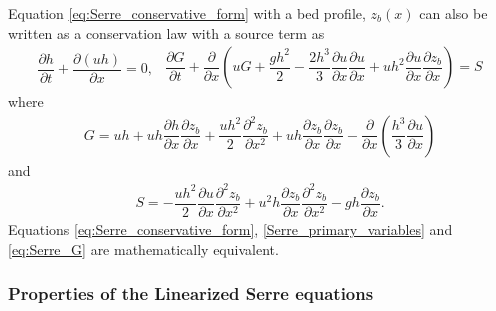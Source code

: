 \documentclass[preprint,sort&compress,1p]{article}
\begin{document}
Equation \eqref{eq:Serre_conservative_form} with a bed profile, $z_b(x)$ can also be written  as a conservation law with a source term as
\begin{subequations}
\label{eq:Serre_G}
\begin{gather}
\dfrac{\partial h}{\partial t} + \dfrac{\partial (uh)}{\partial x} = 0,
\label{eq:Serre_continuity}
\end{gather}
\label{eqnSerreG}
\begin{align}
\label{eqnSerreconsconmom}
\dfrac{\partial G}{\partial t} + \dfrac{\partial}{\partial x} \left( u G + \dfrac{gh^2}{2} - \dfrac{2h^3}{3} \dfrac{\partial u}{\partial x}\dfrac{\partial u}{\partial x} + u h^2\dfrac{\partial u}{\partial x}\dfrac{\partial z_b}{\partial x} \right) =  S
\end{align}
\end{subequations}
where
\begin{align}
G =  uh + uh \dfrac{\partial h}{\partial x}\dfrac{\partial z_b}{\partial x} + \dfrac{uh^2}{2} \dfrac{\partial^2 z_b}{\partial x^2} + uh \dfrac{\partial z_b}{\partial x} \dfrac{\partial z_b}{\partial x} - \dfrac{\partial}{\partial x} \left( \dfrac{h^3}{3} \dfrac{\partial u}{\partial x} \right)
\label{eqnG}
\end{align}
and
\begin{align}
S = -  \dfrac{uh^2}{2}\dfrac{\partial u}{\partial x} \dfrac{\partial^2 z_b}{\partial x^2}  + u^2 h \dfrac{\partial z_b}{\partial x} \dfrac{\partial^2 z_b}{\partial x^2} - gh \dfrac{\partial z_b}{\partial x}.
\label{eq:Source}
\end{align}
Equations \eqref{eq:Serre_conservative_form},  \eqref{Serre_primary_variables} and \eqref{eq:Serre_G} are mathematically equivalent.

\subsubsection{Properties of the Linearized Serre equations}
\end{document}
